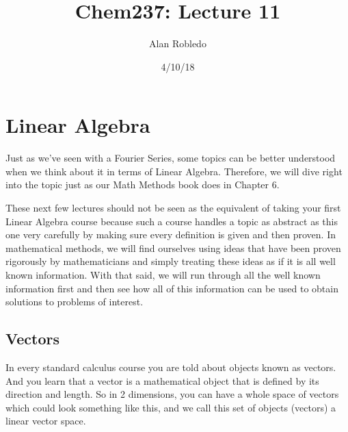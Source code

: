 \documentclass{article}
\title{Chem237: Lecture 11}
\date{4/10/18}
\author{Alan Robledo}
\begin{document}
\maketitle
\section*{Linear Algebra}
Just as we've seen with a Fourier Series, some topics can be better understood when we think about it in terms of Linear Algebra.
Therefore, we will dive right into the topic just as our Math Methods book does in Chapter 6.

These next few lectures should not be seen as the equivalent of taking your first Linear Algebra course because such a course handles a topic as abstract as this one very carefully by making sure every definition is given and then proven.
In mathematical methods, we will find ourselves using ideas that have been proven rigorously by mathematicians and simply treating these ideas as if it is all well known information.
With that said, we will run through all the well known information first and then see how all of this information can be used to obtain solutions to problems of interest.

\subsection*{Vectors}
In every standard calculus course you are told about objects known as vectors.
And you learn that a vector is a mathematical object that is defined by its direction and length.
So in 2 dimensions, you can have a whole space of vectors which could look something like this,
and we call this set of objects (vectors) a linear vector space.
\end{document}
